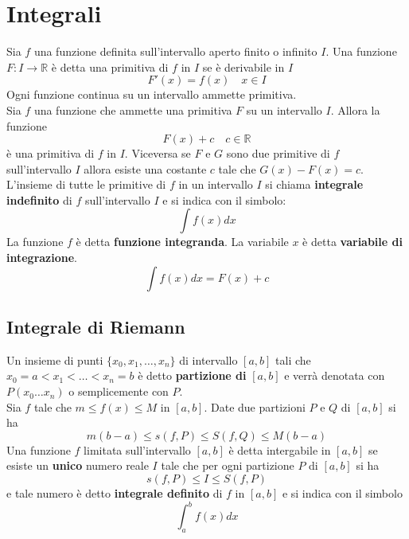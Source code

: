\documentclass[12pt, a4paper]{report}
\begin{document}
    \chapter{Integrali}
    Sia $f$ una funzione definita sull'intervallo aperto finito o infinito $I$. Una funzione $F:I\to\mathbb{R}$ è detta una primitiva di $f$ in $I$ se è derivabile  in $I$
    \begin{equation*}
        F'(x)=f(x) \quad x\in I
    \end{equation*}
    Ogni funzione continua su un intervallo ammette primitiva.\\
    Sia $f$ una funzione che ammette una primitiva $F$ su un intervallo $I$. Allora la funzione
    \begin{equation*}
        F(x)+c \quad c\in \mathbb{R}
    \end{equation*}
    è una primitiva di $f$ in $I$. Viceversa se $F$ e $G$ sono due primitive di $f$ sull'intervallo $I$ allora esiste una costante $c$ tale che $G(x)-F(x)=c$.\\
    L'insieme di tutte le primitive di $f$ in un intervallo $I$ si chiama \textbf{integrale indefinito} di $f$ sull'intervallo $I$ e si indica con il simbolo:
    \begin{equation*}
        \int f(x)dx
    \end{equation*}
    La funzione $f$ è detta \textbf{funzione integranda}. La variabile $x$ è detta \textbf{variabile di integrazione}.
    \begin{equation*}
        \int f(x)dx=F(x)+c
    \end{equation*}
    \section{Integrale di Riemann}
    Un insieme di punti $\{x_{0},x_{1},\ldots,x_{n}\}$ di intervallo $[a,b]$ tali che $x_{0}=a<x_{1}<\ldots<x_{n}=b$ è detto \textbf{partizione di} $[a,b]$ e verrà denotata con $P(x_{0}\dots x_{n})$ o semplicemente con $P$.\\
    Sia $f$ tale che $m\leq f(x)\leq M$ in $[a,b]$. Date due partizioni $P$ e $Q$ di $[a,b]$ si ha
    \begin{equation*}
        m(b-a)\leq s(f,P)\leq S(f,Q)\leq M(b-a)
    \end{equation*}
    Una funzione $f$ limitata sull'intervallo $[a,b]$ è detta intergabile in $[a,b]$ se esiste un \textbf{unico} numero reale $I$ tale che per ogni partizione $P$ di $[a,b]$ si ha
    \begin{equation*}
        s(f,P)\leq I\leq S(f,P)
    \end{equation*}
    e tale numero è detto \textbf{integrale definito} di $f$ in $[a,b]$ e si indica con il simbolo
    \begin{equation*}
        \int_{a}^{b}f(x)dx
    \end{equation*}
\end{document}
